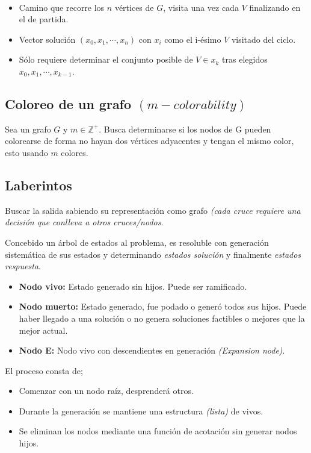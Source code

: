 \begin{definition}~
	\begin{itemize}
		\item Camino que recorre los $n$ vértices de $G$, visita una vez cada $V$ finalizando en el de partida.
		\item Vector solución $(x_0,x_1,\cdots,x_n)$ con $x_i$ como el i-ésimo $V$ visitado del ciclo.
		\item Sólo requiere determinar el conjunto posible de $V\in x_k$ tras elegidos $x_0,x_1,\cdots,x_{k-1}$.
	\end{itemize}

\end{definition}


\subsection{Coloreo de un grafo $(m-colorability)$}
Sea un grafo $G$ y $m\in\mathbb Z^+$.
Busca determinarse si los nodos de G pueden colorearse de forma no hayan dos vértices adyacentes y tengan el mismo color, esto usando $m$ colores.


\subsection{Laberintos}
Buscar la salida sabiendo su representación como grafo \textit{(cada cruce requiere una decisión que conlleva a otros cruces/nodos}.



\begin{theorem}
	Concebido un árbol de estados al problema, es resoluble con generación sistemática de sus estados y determinando \textit{estados solución} y finalmente \textit{estados respuesta}.
	\begin{itemize}
		\item \textbf{Nodo vivo:} Estado generado sin hijos. Puede ser ramificado.
		\item \textbf{Nodo muerto:} Estado generado, fue podado o generó todos sus hijos. Puede haber llegado a una solución o no genera soluciones factibles o mejores que la mejor actual.
		\item \textbf{Nodo E:} Nodo vivo con descendientes en generación \textit{(Expansion node)}.
	\end{itemize}
	El proceso consta de;
	\begin{itemize}
		\item Comenzar con un nodo raíz, desprenderá otros.
		\item Durante la generación se mantiene una estructura \textit{(lista)} de vivos.
		\item Se eliminan los nodos mediante una función de acotación sin generar nodos hijos.
	\end{itemize}
\end{theorem}

